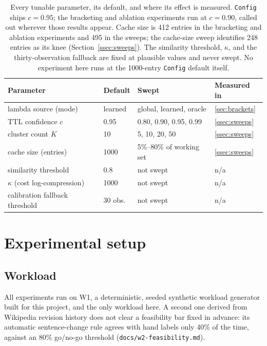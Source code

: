 \documentclass[10pt]{article}
\begin{document}
\begin{table}[H]
\centering
\caption{Every tunable parameter, its default, and where its effect is measured.
\texttt{Config} ships $c=0.95$; the bracketing and ablation experiments run at $c=0.90$,
called out wherever those results appear. Cache size is 412 entries in the bracketing and
ablation experiments and 495 in the sweeps; the cache-size sweep identifies 248 entries as
its knee (Section~\ref{ssec:sweeps}). The similarity threshold, $\kappa$, and the
thirty-observation fallback are fixed at plausible values and never swept. No experiment
here runs at the 1000-entry \texttt{Config} default itself.}
\label{tab:params}
\begin{tabular}{llll}
\toprule
Parameter & Default & Swept & Measured in \\
\midrule
lambda source (mode) & learned & global, learned, oracle & \ref{sec:brackets} \\
TTL confidence $c$ & 0.95 & 0.80, 0.90, 0.95, 0.99 & \ref{ssec:sweeps} \\
cluster count $K$ & 10 & 5, 10, 20, 50 & \ref{ssec:sweeps} \\
cache size (entries) & 1000 & 5\%--80\% of working set & \ref{ssec:sweeps} \\
similarity threshold & 0.8 & not swept & n/a \\
$\kappa$ (cost log-compression) & 1000 & not swept & n/a \\
calibration fallback threshold & 30 obs.\ & not swept & n/a \\
\bottomrule
\end{tabular}
\end{table}

\section{Experimental setup}

\subsection{Workload}
\label{ssec:workload}

All experiments run on W1, a deterministic, seeded synthetic workload generator built for
this project, and the only workload here. A second one derived from Wikipedia revision
history does not clear a feasibility bar fixed in advance: its automatic sentence-change rule
agrees with hand labels only 40\% of the time, against an 80\% go/no-go threshold
(\texttt{docs/w2-feasibility.md}).
\end{document}
